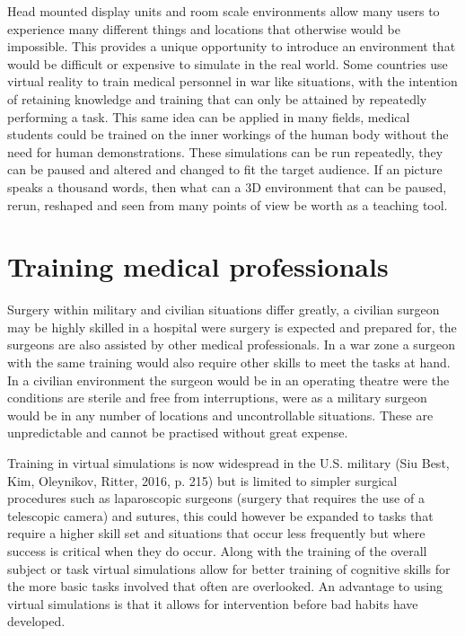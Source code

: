 \documentclass[10pt,journal,compsoc]{IEEEtran}
\begin{document}
	Head mounted display units and room scale environments allow many users to experience many different things and locations that otherwise would be impossible. This provides a unique opportunity to introduce an environment that would be difficult or expensive to simulate in the real world. Some countries use virtual reality to train medical personnel in war like situations, with the intention of retaining knowledge and training that can only be attained by repeatedly performing a task. This same idea can be applied in many fields,  medical students could be trained on the inner workings of the human body without the need for human demonstrations. These simulations can be run repeatedly, they can be paused and altered and changed to fit the target audience. If an picture speaks a thousand words, then what can a 3D environment that can be paused, rerun, reshaped and seen from many points of view be worth as a teaching tool.
	\newline
		
	\section{Training medical professionals}	
	Surgery within military and civilian situations differ greatly, a civilian surgeon may be highly skilled in a hospital were surgery is expected and prepared for, the surgeons are also assisted by other medical professionals. In a war zone a surgeon with the same training would also require other skills to meet the tasks at hand. In a civilian environment the surgeon would be in an operating theatre were the conditions are sterile and free from interruptions, were as a military surgeon would be in any number of locations and uncontrollable situations. These are unpredictable and cannot be practised without great expense. \newline
	
	Training in virtual simulations is now widespread in the U.S. military (Siu Best, Kim, Oleynikov, Ritter, 2016, p. 215) but is limited to simpler surgical procedures such as laparoscopic surgeons (surgery that requires the use of a telescopic camera) and sutures, this could however be expanded to tasks that require a higher skill set and situations that occur less frequently but where success is critical when they do occur. Along with the training of the overall subject or task virtual simulations allow for better training of cognitive skills for the more basic tasks involved that often are overlooked. \newline
	An advantage to using virtual simulations is that it allows for intervention before bad habits have developed. 
	
\end{document}
